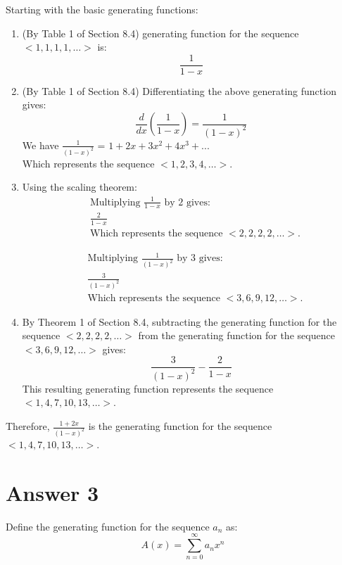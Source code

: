 \documentclass[12pt]{article}
\begin{document}
Starting with the basic generating functions:
\begin{enumerate}
    \item (By Table 1 of Section 8.4) generating function for the sequence \( <1, 1, 1, 1, \dots> \) is:
    \[ \frac{1}{1-x} \]

    \item (By Table 1 of Section 8.4) Differentiating the above generating function gives:
    \[ \frac{d}{dx} \left( \frac{1}{1-x} \right) = \frac{1}{(1-x)^2} \]
    We have \(\frac{1}{(1-x)^2}\) = \(1+2x+3x^2+4x^3+...\) \\
    Which represents the sequence \( <1, 2, 3, 4, \dots> \).

    \item Using the scaling theorem:
    \begin{align*}
    &\text{Multiplying } \frac{1}{1-x} \text{ by 2 gives:} \\
    &\frac{2}{1-x} \\
    &\text{Which represents the sequence } <2, 2, 2, 2, \dots>.
    \end{align*}

    \begin{align*}
    &\text{Multiplying } \frac{1}{(1-x)^2} \text{ by 3 gives:} \\
    &\frac{3}{(1-x)^2} \\
    &\text{Which represents the sequence } <3, 6, 9, 12, \dots>.
    \end{align*}

    \item By Theorem 1 of Section 8.4, subtracting the generating function for the sequence \( <2, 2, 2, 2, \dots> \) from the generating function for the sequence \( <3, 6, 9, 12, \dots> \) gives:
    \[ \frac{3}{(1-x)^2} - \frac{2}{1-x} \]
    This resulting generating function represents the sequence \( <1, 4, 7, 10, 13, \dots> \).
\end{enumerate}

Therefore, \( \frac{1+2x}{(1-x)^2} \)  is the generating function for the sequence \( <1, 4, 7, 10, 13, \dots> \).



\section*{Answer 3}

Define the generating function for the sequence \( a_n \) as:
\[ A(x) = \sum_{n=0}^{\infty} a_n x^n \]
\end{document}

